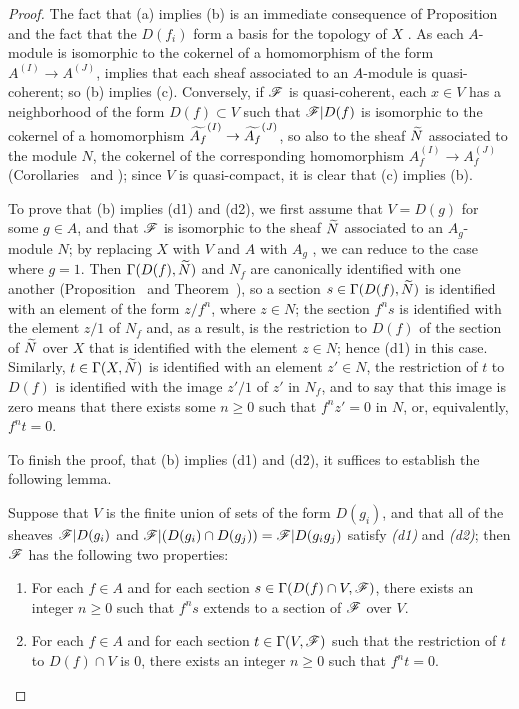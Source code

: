\begin{proof}
\label{proof-1.1.4.1}
The fact that (a) implies (b) is an immediate consequence of Proposition~ and the fact that the $D(f_i)$ form a basis for the topology of $X$ .
As each $A$-module is isomorphic to the cokernel of a homomorphism of the form $A^{(I)}\to A^{(J)}$,  implies that each sheaf associated to an $A$-module is quasi-coherent;
so (b) implies (c).
Conversely, if $\mathscr{F}$ is quasi-coherent, each $x\in V$ has a neighborhood of the form $D(f)\subset V$ such that $\mathscr{F}|D(f)$ is isomorphic to the cokernel of a homomorphism $\wt{A_f}^{(I)}\to\wt{A_f}^{(J)}$, so also to the sheaf ${\widetilde{N}}$ associated to the module $N$, the cokernel of the corresponding homomorphism
$A_f^{(I)}\to A_f^{(J)}$ (Corollaries~ and );
since $V$ is quasi-compact, it is clear that (c) implies (b).

To prove that (b) implies (d1) and (d2), we first assume that $V=D(g)$ for some $g\in A$, and that $\mathscr{F}$ is isomorphic to the sheaf ${\widetilde{N}}$ associated to an $A_g$-module $N$;
by replacing $X$ with $V$ and $A$ with $A_g$ , we can reduce to the case where $g=1$.
Then $\Gamma(D(f),{\widetilde{N}})$ and $N_f$ are canonically identified with one another (Proposition~ and Theorem~), so a section $s\in\Gamma(D(f),{\widetilde{N}})$ is identified with an element of the form $z/f^n$, where $z\in N$;
the section $f^n s$ is identified with the element $z/1$ of $N_f$ and, as a result, is the restriction to $D(f)$ of the section of ${\widetilde{N}}$ over $X$ that is identified with the element $z\in N$;
hence (d1) in this case.
Similarly, $t\in\Gamma(X,{\widetilde{N}})$ is identified with an element $z'\in N$, the restriction of $t$ to $D(f)$ is identified with the image $z'/1$ of $z'$ in $N_f$, and to say that this image is zero means that there exists some $n\geqslant 0$ such that $f^n z'=0$ in $N$, or, equivalently, $f^n t=0$.

To finish the proof, that (b) implies (d1) and (d2), it suffices to establish the following lemma.
\begin{lem}[1.4.1.1]
\label{1.1.4.1.1}
Suppose that $V$ is the finite union of sets of the form $D(g_i)$, and that all of the sheaves $\mathscr{F}|D(g_i)$ and $\mathscr{F}|(D(g_i)\cap D(g_j))=\mathscr{F}|D(g_i g_j)$ satisfy \emph{(d1)} and \emph{(d2)};
then $\mathscr{F}$ has the following two properties:
\begin{enumerate}[label=\emph{(d$'$\arabic*)}]
  \item For each $f\in A$ and for each section $s\in\Gamma(D(f)\cap V,\mathscr{F})$, there exists an integer $n\geqslant 0$ such that $f^n s$ extends to a section of $\mathscr{F}$ over $V$.
  \item For each $f\in A$ and for each section $t\in\Gamma(V,\mathscr{F})$ such that the restriction of $t$ to $D(f)\cap V$ is $0$, there exists an integer $n\geqslant 0$ such that $f^n t=0$.
\end{enumerate}
\end{lem}


\end{proof}
